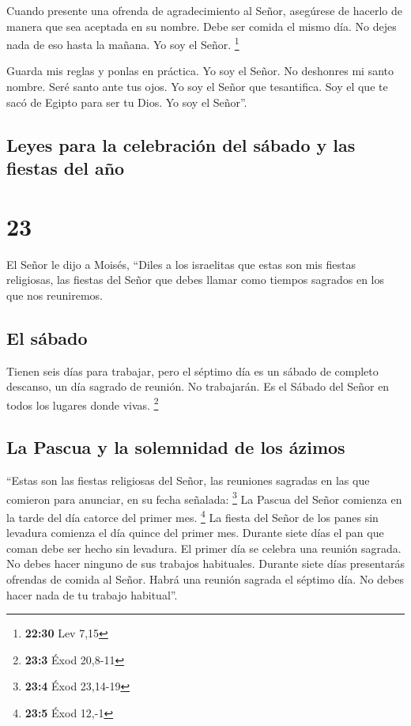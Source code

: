  Cuando presente una ofrenda de agradecimiento al Señor,
asegúrese de hacerlo de manera que sea aceptada en su nombre.
 Debe ser comida el mismo día. No dejes nada de eso hasta
la mañana. Yo soy el Señor. \footnote{\textbf{22:30} Lev 7,15}

 Guarda mis reglas y ponlas en práctica. Yo soy el Señor.
 No deshonres mi santo nombre. Seré santo ante tus ojos.
Yo soy el Señor que tesantifica.  Soy el que te sacó de
Egipto para ser tu Dios. Yo soy el Señor''.

\hypertarget{leyes-para-la-celebraciuxf3n-del-suxe1bado-y-las-fiestas-del-auxf1o}{%
\subsection{Leyes para la celebración del sábado y las fiestas del
año}\label{leyes-para-la-celebraciuxf3n-del-suxe1bado-y-las-fiestas-del-auxf1o}}

\hypertarget{section-22}{%
\section{23}\label{section-22}}

 El Señor le dijo a Moisés,  ``Diles a los
israelitas que estas son mis fiestas religiosas, las fiestas del Señor
que debes llamar como tiempos sagrados en los que nos reuniremos.

\hypertarget{el-suxe1bado}{%
\subsection{El sábado}\label{el-suxe1bado}}

 Tienen seis días para trabajar, pero el séptimo día es un
sábado de completo descanso, un día sagrado de reunión. No trabajarán.
Es el Sábado del Señor en todos los lugares donde vivas. \footnote{\textbf{23:3}
  Éxod 20,8-11}

\hypertarget{la-pascua-y-la-solemnidad-de-los-uxe1zimos}{%
\subsection{La Pascua y la solemnidad de los
ázimos}\label{la-pascua-y-la-solemnidad-de-los-uxe1zimos}}

 ``Estas son las fiestas religiosas del Señor, las
reuniones sagradas en las que comieron para anunciar, en su fecha
señalada: \footnote{\textbf{23:4} Éxod 23,14-19}  La
Pascua del Señor comienza en la tarde del día catorce del primer mes.
\footnote{\textbf{23:5} Éxod 12,-1}  La fiesta del Señor
de los panes sin levadura comienza el día quince del primer mes. Durante
siete días el pan que coman debe ser hecho sin levadura. 
El primer día se celebra una reunión sagrada. No debes hacer ninguno de
sus trabajos habituales.  Durante siete días presentarás
ofrendas de comida al Señor. Habrá una reunión sagrada el séptimo día.
No debes hacer nada de tu trabajo habitual''.

